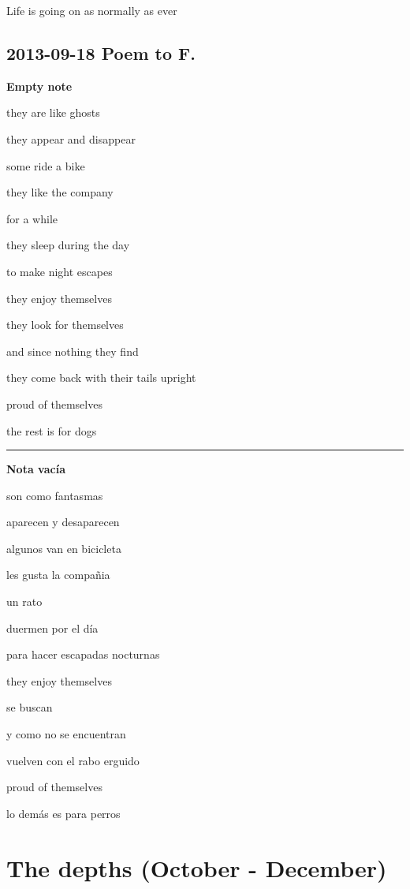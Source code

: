 \documentclass[]{book}
\begin{document}
Life is going on as normally as ever

\hypertarget{toF20130918}{%
\section*{2013-09-18 Poem to F.}\label{toF20130918}}

\textbf{Empty note}

they are like ghosts

they appear and disappear

some ride a bike

they like the company

for a while

they sleep during the day

to make night escapes

they enjoy themselves

they look for themselves

and since nothing they find

they come back with their tails upright

proud of themselves

the rest is for dogs

\begin{center}\rule{0.5\linewidth}{\linethickness}\end{center}

\textbf{Nota vacía}

son como fantasmas

aparecen y desaparecen

algunos van en bicicleta

les gusta la compañia

un rato

duermen por el día

para hacer escapadas nocturnas

they enjoy themselves

se buscan

y como no se encuentran

vuelven con el rabo erguido

proud of themselves

lo demás es para perros

\hypertarget{depths}{%
\chapter*{The depths (October - December)}\label{depths}}
\end{document}
